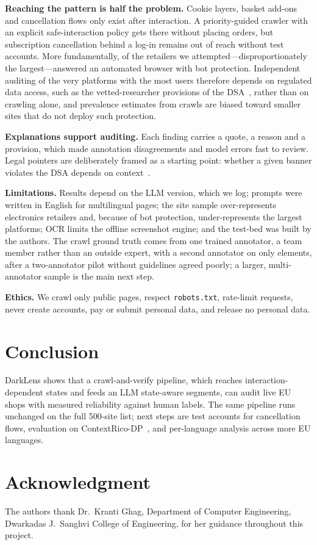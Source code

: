 \documentclass[conference]{IEEEtran}
\begin{document}
\textbf{Reaching the pattern is half the problem.} Cookie layers, basket add-ons and cancellation flows only
exist after interaction. A priority-guided crawler with an explicit safe-interaction policy gets there
without placing orders, but subscription cancellation behind a log-in remains out of reach without test
accounts. More fundamentally, \CrawlBlockedPct{} of the retailers we attempted---disproportionately the
largest---answered an automated browser with bot protection. Independent auditing of the very platforms with
the most users therefore depends on regulated data access, such as the vetted-researcher provisions of the
DSA~\cite{dsa2022}, rather than on crawling alone, and prevalence estimates from crawls are biased toward smaller
sites that do not deploy such protection.

\textbf{Explanations support auditing.} Each finding carries a quote, a reason and a provision, which made
annotation disagreements and model errors fast to review. Legal pointers are deliberately framed as a
starting point: whether a given banner violates the DSA depends on context~\cite{ahuja2026dsa}.

\textbf{Limitations.} Results depend on the LLM version, which we log; prompts were written in English for
multilingual pages; the site sample over-represents electronics retailers and, because of bot protection,
under-represents the largest platforms; OCR limits the offline
screenshot engine; and the test-bed was built by the authors. The crawl ground truth comes from one trained
annotator, a team member rather than an outside expert, with a second annotator on only \SecondN{} elements,
after a two-annotator pilot without guidelines agreed poorly; a larger, multi-annotator sample is the main next step.

\textbf{Ethics.} We crawl only public pages, respect \texttt{robots.txt}, rate-limit requests, never create
accounts, pay or submit personal data, and release no personal data.

\section{Conclusion}
DarkLens shows that a crawl-and-verify pipeline, which reaches interaction-dependent states and feeds an LLM
state-aware segments, can audit live EU shops with measured reliability against human labels. The same
pipeline runs unchanged on the full 500-site list; next steps are test accounts for cancellation flows,
evaluation on ContextRico-DP~\cite{lin2026dpdgpt}, and per-language analysis across more EU languages.

\section*{Acknowledgment}
The authors thank Dr.\ Kranti Ghag, Department of Computer Engineering, Dwarkadas J.\ Sanghvi College of
Engineering, for her guidance throughout this project.



\end{document}
